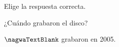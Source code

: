 
\begin{question}

\begin{instance}
  
\begin{mcq}[standalone=false]
    
\begin{stem}
      Elige la respuesta correcta.\par      
\begin{enumerationnolabel}
        \item{¿Cuándo grabaron el disco?}        
        \item{$\nagwaTextBlank$ grabaron en 2005.}      
\end{enumerationnolabel}
    
\end{stem}
    
\begin{distractors}
\end{distractors}
              
\end{mcq}

\end{instance}

\end{question}
